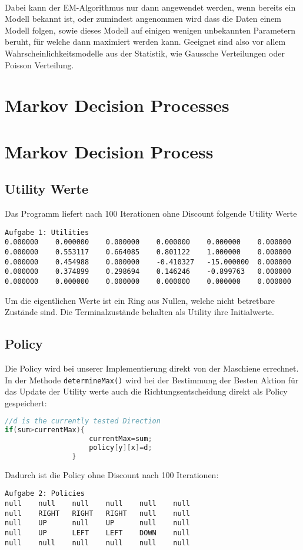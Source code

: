 \documentclass[a4paper]{article}
\begin{document}
\paragraph{}
Dabei kann der EM-Algorithmus nur dann angewendet werden, wenn bereits ein Modell bekannt ist, oder zumindest angenommen wird dass die Daten einem Modell folgen, sowie dieses Modell auf einigen wenigen unbekannten Parametern beruht, für welche dann maximiert werden kann. Geeignet sind also vor allem Wahrscheinlichkeitsmodelle aus der Statistik, wie Gaussche Verteilungen oder Poisson Verteilung.

\section{Markov Decision Processes}


\section{Markov Decision Process}
\lstset{numbers=none}
\subsection{Utility Werte}
Das Programm liefert nach 100 Iterationen ohne Discount folgende Utility Werte
\begin{lstlisting}
Aufgabe 1: Utilities
0.000000 	0.000000 	0.000000 	0.000000 	0.000000 	0.000000 	
0.000000 	0.553117 	0.664085 	0.801122 	1.000000 	0.000000 	
0.000000 	0.454988 	0.000000 	-0.410327 	-15.000000 	0.000000 	
0.000000 	0.374899 	0.298694 	0.146246 	-0.899763 	0.000000 	
0.000000 	0.000000 	0.000000 	0.000000 	0.000000 	0.000000 	
\end{lstlisting}
Um die eigentlichen Werte ist ein Ring aus Nullen, welche nicht betretbare Zustände sind. Die Terminalzustände behalten als Utility ihre Initialwerte.
\subsection{Policy}
Die Policy wird bei unserer Implementierung direkt von der Maschiene errechnet. In der Methode \texttt{determineMax()} wird bei der Bestimmung der Besten Aktion für das Update der Utility werte auch die Richtungsentscheidung direkt als Policy gespeichert:
\begin{lstlisting}[language=Java]
//d is the currently tested Direction
if(sum>currentMax){
					currentMax=sum;
					policy[y][x]=d;
				}
\end{lstlisting}
Dadurch ist die Policy ohne Discount nach 100 Iterationen:
\begin{lstlisting}
Aufgabe 2: Policies
null	null	null	null	null	null	
null	RIGHT	RIGHT	RIGHT	null	null	
null	UP		null	UP		null	null	
null	UP		LEFT	LEFT	DOWN	null	
null	null	null	null	null	null	
\end{lstlisting}
\end{document}
